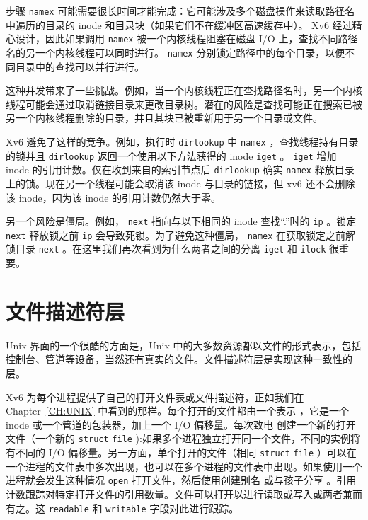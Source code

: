 步骤
    \lstinline{namex}    可能需要很长时间才能完成：它可能涉及多个磁盘操作来读取路径名中遍历的目录的 inode 和目录块（如果它们不在缓冲区高速缓存中）。 Xv6 经过精心设计，因此如果调用
    \lstinline{namex}    被一个内核线程阻塞在磁盘 I/O 上，查找不同路径名的另一个内核线程可以同时进行。
    \lstinline{namex}    分别锁定路径中的每个目录，以便不同目录中的查找可以并行进行。  

这种并发带来了一些挑战。例如，当一个内核线程正在查找路径名时，另一个内核线程可能会通过取消链接目录来更改目录树。潜在的风险是查找可能正在搜索已被另一个内核线程删除的目录，并且其块已被重新用于另一个目录或文件。  

Xv6 避免了这样的竞争。例如，执行时
    \lstinline{dirlookup}    中
    \lstinline{namex}    ，查找线程持有目录的锁并且
    \lstinline{dirlookup}    返回一个使用以下方法获得的 inode
    \lstinline{iget}    。
    \lstinline{iget}    增加 inode 的引用计数。仅在收到来自的索引节点后
    \lstinline{dirlookup}    确实
    \lstinline{namex}    释放目录上的锁。现在另一个线程可能会取消该 inode 与目录的链接，但 xv6 还不会删除该 inode，因为该 inode 的引用计数仍然大于零。  

另一个风险是僵局。例如，
    \lstinline{next}    指向与以下相同的 inode
 查找“.”时的    \lstinline{ip}   。锁定
    \lstinline{next}    释放锁之前
    \lstinline{ip}    会导致死锁。为了避免这种僵局，
    \lstinline{namex}    在获取锁定之前解锁目录
    \lstinline{next}    。在这里我们再次看到为什么两者之间的分离
    \lstinline{iget}    和
    \lstinline{ilock}    很重要。
    \section{文件描述符层  }     

Unix 界面的一个很酷的方面是，Unix 中的大多数资源都以文件的形式表示，包括控制台、管道等设备，当然还有真实的文件。文件描述符层是实现这种一致性的层。  

Xv6 为每个进程提供了自己的打开文件表或文件描述符，正如我们在 Chapter~\ref{CH:UNIX}    中看到的那样。每个打开的文件都由一个表示
        ，它是一个 inode 或一个管道的包装器，加上一个 I/O 偏移量。每次致电
        创建一个新的打开文件（一个新的
    \lstinline{struct}   
    \lstinline{file}    ):如果多个进程独立打开同一个文件，不同的实例将有不同的 I/O 偏移量。另一方面，单个打开的文件（相同
    \lstinline{struct}   
    \lstinline{file}    ）可以在一个进程的文件表中多次出现，也可以在多个进程的文件表中出现。如果使用一个进程就会发生这种情况
    \lstinline{open}    打开文件，然后使用创建别名
        或与孩子分享
        。引用计数跟踪对特定打开文件的引用数量。文件可以打开以进行读取或写入或两者兼而有之。这
    \lstinline{readable}    和
    \lstinline{writable}    字段对此进行跟踪。  

